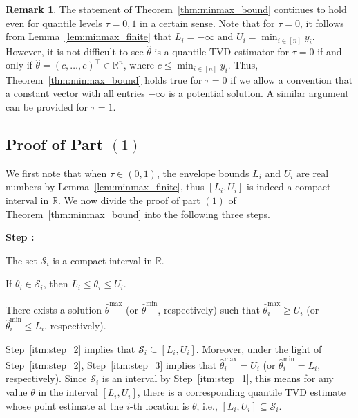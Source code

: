 \documentclass[11pt]{article}
\newcommand{\cS}{\mathcal{S}}
\newcommand{\bR}{\mathbb{R}}
\theoremstyle{plain}
\theoremstyle{definition}
\newtheorem{remark}{Remark}
\theoremstyle{remark}
\begin{document}
 \begin{remark}
        The statement of Theorem~\ref{thm:minmax_bound} continues to hold even for quantile levels $\tau=0,1$ in a certain sense. Note that for $\tau=0$, it follows from Lemma~\ref{lem:minmax_finite} that $L_i=-\infty$ and $U_i=\min_{i\in [n]}y_i$. However, it is not difficult to see $\hat{\theta}$ is a quantile TVD estimator for $\tau=0$ if and only if $\hat{\theta}=(c,\ldots,c)^{\top}\in \bR^n$, where $c\leq \min_{i\in [n]}y_i$. Thus, Theorem~\ref{thm:minmax_bound} holds true for $\tau=0$ if we allow a convention that a constant vector with all entries $-\infty$ is a potential solution. A similar argument can be provided for $\tau=1$.
    \end{remark}



\subsection{Proof of Part $(1)$}\label{sec:minmax_1}
\noindent  We first note that when $\tau \in (0,1)$, the envelope bounds $L_i$ and $U_i$ are real numbers by Lemma~\ref{lem:minmax_finite}, thus $[L_i,U_i]$ is indeed a compact interval in $\bR$. We now divide the proof of part $(1)$ of Theorem~\ref{thm:minmax_bound} into the following three steps.
\begin{list}{\textbf{Step :}}{
    \setlength{\leftmargin}{4em}   %
    \setlength{\labelwidth}{3.5em} %
    \setlength{\labelsep}{0.5em}   %
}
\item \label{itm:step_1} The set $\cS_i$ is a compact interval in $\bR$.
    \item \label{itm:step_2} If $\theta_i \in \cS_i$, then $L_i \leq \theta_i \leq U_i$.
    \item \label{itm:step_3} There exists a solution $\hat{\theta}^{\max}$ (or $\hat{\theta}^{\min}$, respectively) such that $\hat{\theta}^{\max}_i \geq U_i$ (or $\hat{\theta}^{\min}_i \leq L_i$, respectively). 
\end{list}

Step~\ref{itm:step_2} implies that $\cS_i\subseteq [L_i,U_i]$. Moreover, under the light of Step~\ref{itm:step_2}, Step~\ref{itm:step_3} implies that $\hat{\theta}^{\max}_i= U_i$ (or $\hat{\theta}^{\min}_i= L_i$, respectively). Since $\cS_i$ is an interval by Step~\ref{itm:step_1}, this means for any value $\theta$ in the interval $[L_i,U_i]$, there is a corresponding quantile TVD estimate whose point estimate at the $i$-th location is $\theta$, i.e., $[L_i,U_i]\subseteq \cS_i$.
\end{document}
